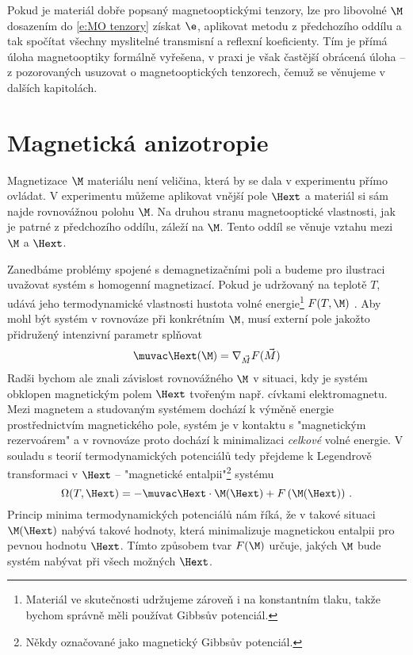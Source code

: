 Pokud je materiál dobře popsaný magnetooptickými tenzory, lze pro libovolné $\M$ dosazením do \eqref{e:MO tenzory} získat $\e$, aplikovat metodu z předchozího oddílu a tak spočítat všechny myslitelné transmisní a reflexní koeficienty.
Tím je přímá úloha magnetooptiky formálně vyřešena, v praxi je však častější obrácená úloha -- z pozorovaných usuzovat o magnetooptických tenzorech, čemuž se věnujeme v dalších kapitolách.

\section{Magnetická anizotropie}

Magnetizace $\M$ materiálu není veličina, která by se dala v experimentu přímo ovládat.
V experimentu můžeme aplikovat vnější pole $\Hext$ a materiál si sám najde rovnovážnou polohu $\M$.
Na druhou stranu magnetooptické vlastnosti, jak je patrné z předchozího oddílu, záleží na $\M$.
Tento oddíl se věnuje vztahu mezi $\M$ a $\Hext$.

Zanedbáme problémy spojené s demagnetizačními poli a budeme pro ilustraci uvažovat systém s homogenní magnetizací. 
Pokud je udržovaný na teplotě $T$, udává jeho termodynamické vlastnosti hustota volné energie\footnote{Materiál ve skutečnosti udržujeme zároveň i na konstantním tlaku, takže bychom správně měli používat Gibbsův potenciál.} $F(T,\M)$ \cite{Callen}.
Aby mohl být systém v rovnováze při konkrétním $\M$, musí externí pole jakožto přidružený intenzivní parametr splňovat
\begin{equation} \label{e:Hext=gradF}
\muvac\Hext(\M) = \nabla_{\vec{M}} F(\vec{M})
\end{equation}
Radši bychom ale znali závislost rovnovážného $\M$ v situaci, kdy je systém obklopen magnetickým polem $\Hext$ tvořeným např. cívkami elektromagnetu. 
Mezi magnetem a studovaným systémem dochází k výměně energie prostřednictvím magnetického pole, systém je v kontaktu s "magnetickým rezervoárem" a v rovnováze proto dochází k minimalizaci \emph{celkové} volné energie. 
V souladu s teorií termodynamických potenciálů tedy přejdeme k Legendrově transformaci v $\Hext$ -- "magnetické entalpii"\footnote{Někdy označované jako magnetický Gibbsův potenciál.} systému\cite{magentalpie}
\begin{equation} \label{e:mag entalpie}
\Omega(T,\Hext)= -\muvac\Hext\cdot\M(\Hext)+F\left(\M(\Hext)\right) \,.
\end{equation}
Princip minima termodynamických potenciálů nám říká, že v takové situaci $\M(\Hext)$ nabývá takové hodnoty, která minimalizuje magnetickou entalpii pro pevnou hodnotu $\Hext$.
Tímto způsobem tvar $F(\M)$ určuje, jakých $\M$ bude systém nabývat při všech možných $\Hext$.

